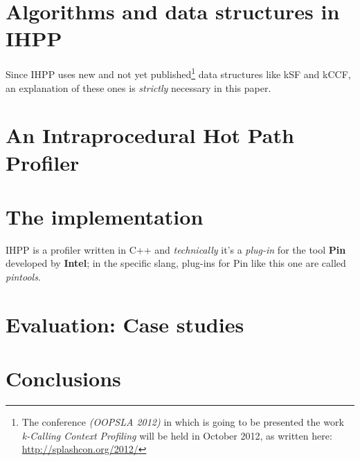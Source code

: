 \documentclass[a4paper,11pt]{report}
\begin{document}
\chapter{Algorithms and data structures in IHPP}
Since IHPP uses new and not yet published\footnote{The conference \emph{(OOPSLA
2012)} in which is going to be presented the work \emph{k-Calling Context
Profiling} will be held in October 2012, as written here:
\url{http://splashcon.org/2012/}} data structures like kSF and kCCF, an
explanation of these ones is \emph{strictly} necessary in this paper.



\chapter{An Intraprocedural Hot Path Profiler}

\chapter{The implementation}

IHPP is a profiler written in C++ and \emph{technically} it's a \emph{plug-in}
for the tool \textbf{Pin} developed by \textbf{Intel}; in the specific slang,
plug-ins for Pin like this one are called \emph{pintools}.

\chapter{Evaluation: Case studies}


\chapter{Conclusions}
\end{document}
